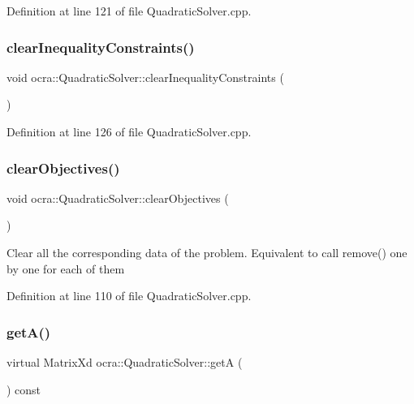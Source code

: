 Definition at line 121 of file Quadratic\+Solver.\+cpp.

\hypertarget{classocra_1_1QuadraticSolver_ac41ecf476cf2bbe6ce17e3520e44f138}{}\label{classocra_1_1QuadraticSolver_ac41ecf476cf2bbe6ce17e3520e44f138} 
\subsubsection{\texorpdfstring{clear\+Inequality\+Constraints()}{clearInequalityConstraints()}}
{\footnotesize\ttfamily void ocra\+::\+Quadratic\+Solver\+::clear\+Inequality\+Constraints (\begin{DoxyParamCaption}{ }\end{DoxyParamCaption})}



Definition at line 126 of file Quadratic\+Solver.\+cpp.

\hypertarget{classocra_1_1QuadraticSolver_a0339ac8b860591dea7f24bc05d58fdf0}{}\label{classocra_1_1QuadraticSolver_a0339ac8b860591dea7f24bc05d58fdf0} 
\subsubsection{\texorpdfstring{clear\+Objectives()}{clearObjectives()}}
{\footnotesize\ttfamily void ocra\+::\+Quadratic\+Solver\+::clear\+Objectives (\begin{DoxyParamCaption}{ }\end{DoxyParamCaption})}

Clear all the corresponding data of the problem. Equivalent to call remove() one by one for each of them 

Definition at line 110 of file Quadratic\+Solver.\+cpp.

\hypertarget{classocra_1_1QuadraticSolver_aa3904e85d74c7c88c3605a082741b8cd}{}\label{classocra_1_1QuadraticSolver_aa3904e85d74c7c88c3605a082741b8cd} 
\subsubsection{\texorpdfstring{get\+A()}{getA()}}
{\footnotesize\ttfamily virtual Matrix\+Xd ocra\+::\+Quadratic\+Solver\+::getA (\begin{DoxyParamCaption}{ }\end{DoxyParamCaption}) const\hspace{0.3cm}{\ttfamily [pure virtual]}}



